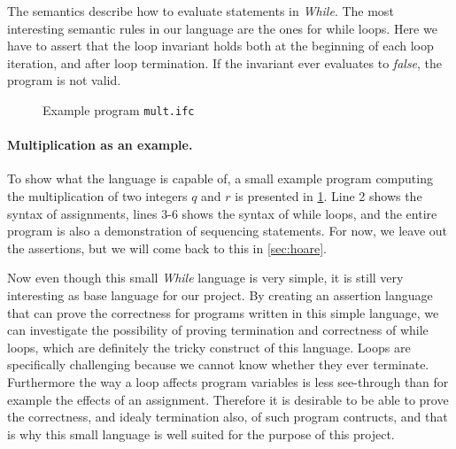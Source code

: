 The semantics describe how to evaluate statements in \textit{While}. The most interesting semantic rules in our language are the ones for while loops.
Here we have to assert that the loop invariant holds both at the beginning of each loop iteration, and after loop termination.
If the invariant ever evaluates to \textit{false}, the program is not valid.

\begin{figure}[h]

\caption{Example program \texttt{mult.ifc}}
\label{figure:basicmult}
\end{figure}

\paragraph{Multiplication as an example.}
To show what the language is capable of, a small example program computing the multiplication of two integers $q$ and $r$ is presented in \cref{figure:basicmult}. Line 2 shows the syntax of assignments, lines $3$-$6$ shows the syntax of while loops, and the entire program is also a demonstration of sequencing statements.
For now, we leave out the assertions, but we will come back to this in \cref{sec:hoare}.

Now even though this small \textit{While} language is very simple, it is still very interesting as base language for our project.
By creating an assertion language that can prove the correctness for programs written in this simple language, we can investigate the possibility of proving termination and correctness of while loops, which are definitely the tricky construct of this language.
Loops are specifically challenging because we cannot know whether they ever terminate. Furthermore the way a loop affects program variables is less see-through than for example the effects of an assignment.
Therefore it is desirable to be able to prove the correctness, and idealy termination also, of such program contructs, and that is why this small language is well suited for the purpose of this project.
